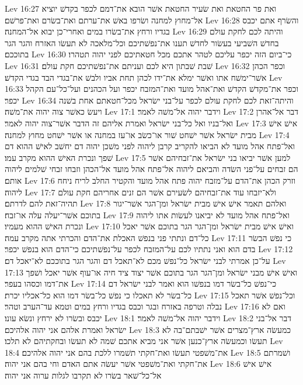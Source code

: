 Lev 16:27  ואת פר החטאת ואת שׂעיר החטאת אשׁר הובא את־דמם לכפר בקדשׁ יוציא אל־מחוץ למחנה ושׂרפו באשׁ את־ערתם ואת־בשׂרם ואת־פרשׁם׃
Lev 16:28  והשׂרף אתם יכבס בגדיו ורחץ את־בשׂרו במים ואחרי־כן יבוא אל־המחנה׃
Lev 16:29  והיתה לכם לחקת עולם בחדשׁ השׁביעי בעשׂור לחדשׁ תענו את־נפשׁתיכם וכל־מלאכה לא תעשׂו האזרח והגר הגר בתוככם׃
Lev 16:30  כי־ביום הזה יכפר עליכם לטהר אתכם מכל חטאתיכם לפני יהוה תטהרו׃
Lev 16:31  שׁבת שׁבתון היא לכם ועניתם את־נפשׁתיכם חקת עולם׃
Lev 16:32  וכפר הכהן אשׁר־ימשׁח אתו ואשׁר ימלא את־ידו לכהן תחת אביו ולבשׁ את־בגדי הבד בגדי הקדשׁ׃
Lev 16:33  וכפר את־מקדשׁ הקדשׁ ואת־אהל מועד ואת־המזבח יכפר ועל הכהנים ועל־כל־עם הקהל יכפר׃
Lev 16:34  והיתה־זאת לכם לחקת עולם לכפר על־בני ישׂראל מכל־חטאתם אחת בשׁנה ויעשׂ כאשׁר צוה יהוה את־משׁה׃
Lev 17:1  וידבר יהוה אל־משׁה לאמר׃
Lev 17:2  דבר אל־אהרן ואל־בניו ואל כל־בני ישׂראל ואמרת אליהם זה הדבר אשׁר־צוה יהוה לאמר׃
Lev 17:3  אישׁ אישׁ מבית ישׂראל אשׁר ישׁחט שׁור או־כשׂב או־עז במחנה או אשׁר ישׁחט מחוץ למחנה׃
Lev 17:4  ואל־פתח אהל מועד לא הביאו להקריב קרבן ליהוה לפני משׁכן יהוה דם יחשׁב לאישׁ ההוא דם שׁפך ונכרת האישׁ ההוא מקרב עמו׃
Lev 17:5  למען אשׁר יביאו בני ישׂראל את־זבחיהם אשׁר הם זבחים על־פני השׂדה והביאם ליהוה אל־פתח אהל מועד אל־הכהן וזבחו זבחי שׁלמים ליהוה אותם׃
Lev 17:6  וזרק הכהן את־הדם על־מזבח יהוה פתח אהל מועד והקטיר החלב לריח ניחח ליהוה׃
Lev 17:7  ולא־יזבחו עוד את־זבחיהם לשׂעירם אשׁר הם זנים אחריהם חקת עולם תהיה־זאת להם לדרתם׃
Lev 17:8  ואלהם תאמר אישׁ אישׁ מבית ישׂראל ומן־הגר אשׁר־יגור בתוכם אשׁר־יעלה עלה או־זבח׃
Lev 17:9  ואל־פתח אהל מועד לא יביאנו לעשׂות אתו ליהוה ונכרת האישׁ ההוא מעמיו׃
Lev 17:10  ואישׁ אישׁ מבית ישׂראל ומן־הגר הגר בתוכם אשׁר יאכל כל־דם ונתתי פני בנפשׁ האכלת את־הדם והכרתי אתה מקרב עמה׃
Lev 17:11  כי נפשׁ הבשׂר בדם הוא ואני נתתיו לכם על־המזבח לכפר על־נפשׁתיכם כי־הדם הוא בנפשׁ יכפר׃
Lev 17:12  על־כן אמרתי לבני ישׂראל כל־נפשׁ מכם לא־תאכל דם והגר הגר בתוככם לא־יאכל דם׃
Lev 17:13  ואישׁ אישׁ מבני ישׂראל ומן־הגר הגר בתוכם אשׁר יצוד ציד חיה או־עוף אשׁר יאכל ושׁפך את־דמו וכסהו בעפר׃
Lev 17:14  כי־נפשׁ כל־בשׂר דמו בנפשׁו הוא ואמר לבני ישׂראל דם כל־בשׂר לא תאכלו כי נפשׁ כל־בשׂר דמו הוא כל־אכליו יכרת׃
Lev 17:15  וכל־נפשׁ אשׁר תאכל נבלה וטרפה באזרח ובגר וכבס בגדיו ורחץ במים וטמא עד־הערב וטהר׃
Lev 17:16  ואם לא יכבס ובשׂרו לא ירחץ ונשׂא עונו׃
Lev 18:1  וידבר יהוה אל־משׁה לאמר׃
Lev 18:2  דבר אל־בני ישׂראל ואמרת אלהם אני יהוה אלהיכם׃
Lev 18:3  כמעשׂה ארץ־מצרים אשׁר ישׁבתם־בה לא תעשׂו וכמעשׂה ארץ־כנען אשׁר אני מביא אתכם שׁמה לא תעשׂו ובחקתיהם לא תלכו׃
Lev 18:4  את־משׁפטי תעשׂו ואת־חקתי תשׁמרו ללכת בהם אני יהוה אלהיכם׃
Lev 18:5  ושׁמרתם את־חקתי ואת־משׁפטי אשׁר יעשׂה אתם האדם וחי בהם אני יהוה׃
Lev 18:6  אישׁ אישׁ אל־כל־שׁאר בשׂרו לא תקרבו לגלות ערוה אני יהוה׃
